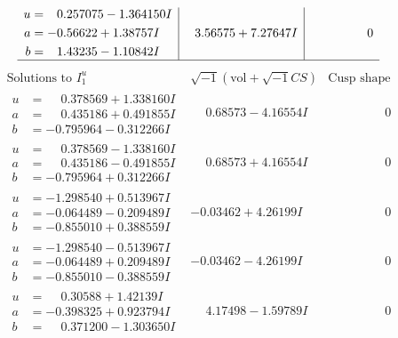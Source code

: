 \documentclass[1p]{elsarticle_modified}
\theoremstyle{definition}
\newcommand{\I}{\sqrt{-1}}
\begin{document}
$$\begin{array}{c|c|c}
\begin{aligned}
u &= \phantom{-}0.257075 - 1.364150 I \\
a &= -0.56622 + 1.38757 I \\
b &= \phantom{-}1.43235 - 1.10842 I\end{aligned}
 & \phantom{-}3.56575 + 7.27647 I & \phantom{-0.000000 } 0\\
 \hline 
 \end{array}$$\newpage$$\begin{array}{c|c|c}  
\text{Solutions to }I^u_{1}& \I (\text{vol} + \sqrt{-1}CS) & \text{Cusp shape}\\
 \hline 
\begin{aligned}
u &= \phantom{-}0.378569 + 1.338160 I \\
a &= \phantom{-}0.435186 + 0.491855 I \\
b &= -0.795964 - 0.312266 I\end{aligned}
 & \phantom{-}0.68573 - 4.16554 I & \phantom{-0.000000 } 0 \\ \hline\begin{aligned}
u &= \phantom{-}0.378569 - 1.338160 I \\
a &= \phantom{-}0.435186 - 0.491855 I \\
b &= -0.795964 + 0.312266 I\end{aligned}
 & \phantom{-}0.68573 + 4.16554 I & \phantom{-0.000000 } 0 \\ \hline\begin{aligned}
u &= -1.298540 + 0.513967 I \\
a &= -0.064489 - 0.209489 I \\
b &= -0.855010 + 0.388559 I\end{aligned}
 & -0.03462 + 4.26199 I & \phantom{-0.000000 } 0 \\ \hline\begin{aligned}
u &= -1.298540 - 0.513967 I \\
a &= -0.064489 + 0.209489 I \\
b &= -0.855010 - 0.388559 I\end{aligned}
 & -0.03462 - 4.26199 I & \phantom{-0.000000 } 0 \\ \hline\begin{aligned}
u &= \phantom{-}0.30588 + 1.42139 I \\
a &= -0.398325 + 0.923794 I \\
b &= \phantom{-}0.371200 - 1.303650 I\end{aligned}
 & \phantom{-}4.17498 - 1.59789 I & \phantom{-0.000000 } 0 \\ \hline\begin{aligned}

\end{aligned}
\end{array}$$
\end{document}
